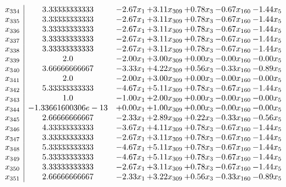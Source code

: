 \documentclass[8pt]{article}
\begin{document}
\[\begin{array}{c| c c@{\hskip 2pt} c@{\hskip 2pt} c@{\hskip 2pt} c@{\hskip 2pt} c@{\hskip 2pt} }
 x_{334}   &  3.33333333333 & -2.67 x_{1} & +  3.11 x_{309} & +  0.78 x_{3} & -0.67 x_{160} & -1.44 x_{5}\\
 x_{335}   &  3.33333333333 & -2.67 x_{1} & +  3.11 x_{309} & +  0.78 x_{3} & -0.67 x_{160} & -1.44 x_{5}\\
 x_{336}   &  3.33333333333 & -2.67 x_{1} & +  3.11 x_{309} & +  0.78 x_{3} & -0.67 x_{160} & -1.44 x_{5}\\
 x_{337}   &  3.33333333333 & -2.67 x_{1} & +  3.11 x_{309} & +  0.78 x_{3} & -0.67 x_{160} & -1.44 x_{5}\\
 x_{338}   &  3.33333333333 & -2.67 x_{1} & +  3.11 x_{309} & +  0.78 x_{3} & -0.67 x_{160} & -1.44 x_{5}\\
 x_{339}   &  2.0 & -2.00 x_{1} & +  3.00 x_{309} & +  0.00 x_{3} & -0.00 x_{160} & -0.00 x_{5}\\
 x_{340}   &  3.66666666667 & -3.33 x_{1} & +  4.22 x_{309} & +  0.56 x_{3} & -0.33 x_{160} & -0.89 x_{5}\\
 x_{341}   &  2.0 & -2.00 x_{1} & +  3.00 x_{309} & +  0.00 x_{3} & -0.00 x_{160} & -0.00 x_{5}\\
 x_{342}   &  5.33333333333 & -4.67 x_{1} & +  5.11 x_{309} & +  0.78 x_{3} & -0.67 x_{160} & -1.44 x_{5}\\
 x_{343}   &  1.0 & -1.00 x_{1} & +  2.00 x_{309} & +  0.00 x_{3} & -0.00 x_{160} & -0.00 x_{5}\\
 x_{344}   &  -1.33661600306e-13 & +  0.00 x_{1} & +  1.00 x_{309} & +  0.00 x_{3} & -0.00 x_{160} & -0.00 x_{5}\\
 x_{345}   &  2.66666666667 & -2.33 x_{1} & +  2.89 x_{309} & +  0.22 x_{3} & -0.33 x_{160} & -0.56 x_{5}\\
 x_{346}   &  4.33333333333 & -3.67 x_{1} & +  4.11 x_{309} & +  0.78 x_{3} & -0.67 x_{160} & -1.44 x_{5}\\
 x_{347}   &  3.33333333333 & -2.67 x_{1} & +  3.11 x_{309} & +  0.78 x_{3} & -0.67 x_{160} & -1.44 x_{5}\\
 x_{348}   &  5.33333333333 & -4.67 x_{1} & +  5.11 x_{309} & +  0.78 x_{3} & -0.67 x_{160} & -1.44 x_{5}\\
 x_{349}   &  5.33333333333 & -4.67 x_{1} & +  5.11 x_{309} & +  0.78 x_{3} & -0.67 x_{160} & -1.44 x_{5}\\
 x_{350}   &  3.33333333333 & -2.67 x_{1} & +  3.11 x_{309} & +  0.78 x_{3} & -0.67 x_{160} & -1.44 x_{5}\\
 x_{351}   &  2.66666666667 & -2.33 x_{1} & +  3.22 x_{309} & +  0.56 x_{3} & -0.33 x_{160} & -0.89 x_{5}\\

\end{array}\]
\end{document}
